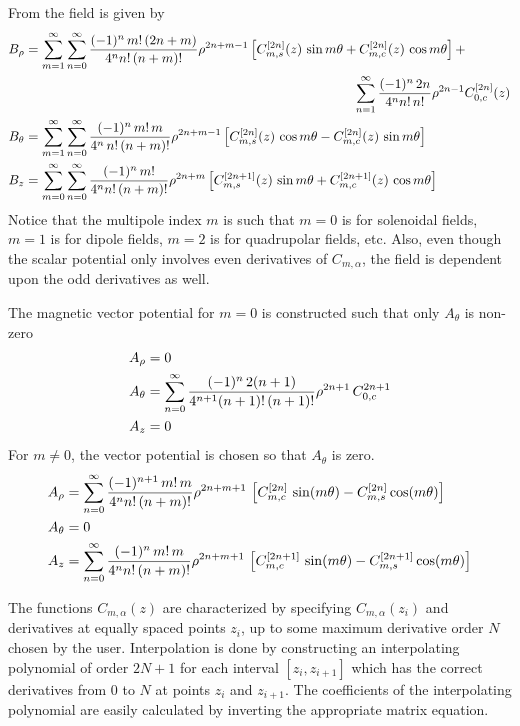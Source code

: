 From  the field is given by 
\begin{align}
  B_\rho   &= \sum_{m = 1}^{\infty} \sum_{n = 0}^\infty \frac{(-1)^n \, m! \, (2n+m)}{4^n n! \, (n+m)!}
    \rho^{2n+m-1} \left[ C^{[2n]}_{m,s}(z) \, \sin m\theta + C^{[2n]}_{m,c}(z) \, \cos m\theta \right] + \CRNO
    & \hspace{25 em} \sum_{n = 1}^\infty \frac{(-1)^n \, 2n}{4^n n! \, n!} \rho^{2n-1} C^{[2n]}_{0,c}(z) \CRNO
  B_\theta &= \sum_{m = 1}^{\infty} \sum_{n = 0}^\infty \frac{(-1)^n \, m! \, m}{4^n \, n! \, (n+m)!}
    \rho^{2n+m-1} \left[ C^{[2n]}_{m,s}(z) \, \cos m\theta - C^{[2n]}_{m,c}(z) \, \sin m\theta \right] \\
  B_z      &= \sum_{m = 0}^{\infty} \sum_{n = 0}^\infty \frac{(-1)^n \, m!}{4^n n! \, (n+m)!}
    \rho^{2n+m} \left[ C^{[2n+1]}_{m,s}(z) \, \sin m\theta + C^{[2n+1]}_{m,c}(z) \, \cos m\theta \right] \nonumber
\end{align}
Notice that the multipole index $m$ is such that $m = 0$ is for solenoidal fields, $m = 1$ is for
dipole fields, $m = 2$ is for quadrupolar fields, etc. Also, even though the scalar potential only
involves even derivatives of $C_{m,\alpha}$, the field is dependent upon the odd derivatives as
well.

The magnetic vector potential for $m = 0$ is constructed such that only $A_\theta$ is non-zero
\begin{align}
  A_\rho   &= 0 \nonumber \\
  A_\theta &= \sum_{n=0}^\infty \frac{(-1)^n \, 2(n+1)}{4^{n+1} (n+1)! \, (n+1)!} \rho^{2n+1} \, C_{0,c}^{2n+1} \\
  A_z      &= 0 \nonumber
\end{align}
For $m \ne 0$, the vector potential is chosen so that $A_\theta$ is zero.
\begin{align}
  A_\rho   &= \sum_{n=0}^\infty \frac{(-1)^{n+1} \, m! \, m}{4^n n! \, (n+m)!} \rho^{2n+m+1} \, 
    \left[ C_{m,c}^{[2n]} \, \sin(m \theta) - C_{m,s}^{[2n]} \cos(m \theta) \right] \nonumber \\ 
  A_\theta &= 0 \\
  A_z      &= \sum_{n=0}^\infty \frac{(-1)^n \, m! \, m}{4^n n! \, (n+m)!} \rho^{2n+m+1} \, 
    \left[ C_{m,c}^{[2n+1]} \, \sin(m \theta) - C_{m,s}^{[2n+1]} \cos(m \theta) \right]
  \nonumber
\end{align}

The functions $C_{m,\alpha}(z)$ are characterized by specifying $C_{m,\alpha}(z_i)$ and derivatives
at equally spaced points $z_i$, up to some maximum derivative order $N$ chosen by the
user. Interpolation is done by constructing an interpolating polynomial of order $2N+1$ for each
interval $[z_i, z_{i+1}]$ which has the correct derivatives from $0$ to $N$ at points $z_i$ and
$z_{i+1}$. The coefficients of the interpolating polynomial are easily calculated by inverting the
appropriate matrix equation.

